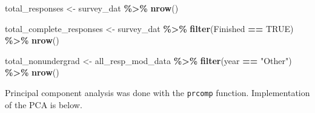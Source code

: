 \documentclass[12pt,twoside]{reedthesis}
\newenvironment{Shaded}{\begin{snugshade}}{\end{snugshade}}
\newcommand{\KeywordTok}[1]{\textcolor[rgb]{0.13,0.29,0.53}{\textbf{#1}}}
\newcommand{\NormalTok}[1]{#1}
\newcommand{\OperatorTok}[1]{\textcolor[rgb]{0.81,0.36,0.00}{\textbf{#1}}}
\newcommand{\OtherTok}[1]{\textcolor[rgb]{0.56,0.35,0.01}{#1}}
\newcommand{\StringTok}[1]{\textcolor[rgb]{0.31,0.60,0.02}{#1}}
\begin{document}
\begin{Shaded}
\begin{Highlighting}[]
\NormalTok{total\_responses \textless{}{-}}\StringTok{ }\NormalTok{survey\_dat }\OperatorTok{\%\textgreater{}\%}
\StringTok{  }\KeywordTok{nrow}\NormalTok{()}

\NormalTok{total\_complete\_responses \textless{}{-}}\StringTok{ }\NormalTok{survey\_dat }\OperatorTok{\%\textgreater{}\%}
\StringTok{  }\KeywordTok{filter}\NormalTok{(Finished }\OperatorTok{==}\StringTok{ }\OtherTok{TRUE}\NormalTok{) }\OperatorTok{\%\textgreater{}\%}
\StringTok{  }\KeywordTok{nrow}\NormalTok{()}

\NormalTok{total\_nonundergrad \textless{}{-}}\StringTok{ }\NormalTok{all\_resp\_mod\_data }\OperatorTok{\%\textgreater{}\%}
\StringTok{  }\KeywordTok{filter}\NormalTok{(year }\OperatorTok{==}\StringTok{ "Other"}\NormalTok{) }\OperatorTok{\%\textgreater{}\%}
\StringTok{  }\KeywordTok{nrow}\NormalTok{()}
\end{Highlighting}
\end{Shaded}
Principal component analysis was done with the \texttt{prcomp} function. Implementation of the PCA is below.
\end{document}
